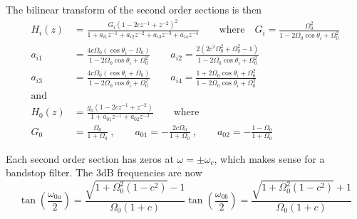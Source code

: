 The bilinear transform of the second order sections is then
\begin{align*}
	H_i(z) &= \frac{G_i(1-2cz^{-1}+z^{-2})^2}{1+a_{i1}z^{-1}+a_{i2}z^{-2}+a_{i3}z^{-3}+a_{i4}z^{-4}}
	\qquad \text{where} \quad
	G_i = \frac{\Omega_0^2}{1-2\Omega_0\cos\theta_i+\Omega_0^2} \\
	a_{i1} &= \frac{4c\Omega_0(\cos\theta_i-\Omega_0)}{1-2\Omega_0\cos\theta_i+\Omega_0^2} \qquad
	a_{i2} = \frac{2(2c^2\Omega_0^2+\Omega_0^2-1)}{1-2\Omega_0\cos\theta_i+\Omega_0^2} \\
	a_{i3} &= \frac{4c\Omega_0(\cos\theta_i+\Omega_0)}{1-2\Omega_0\cos\theta_i+\Omega_0^2} \qquad
	a_{i4} = \frac{1+2\Omega_0\cos\theta_i+\Omega_0^2}{1-2\Omega_0\cos\theta_i+\Omega_0^2} \\
	\text{and} \\
	H_0(z) &= \frac{g_0(1-2cz^{-1}+z^{-2})}{1+a_{01}z^{-1}+a_{02}z^{-2}} \qquad \text{where} \\
	G_0 &= \frac{\Omega_0}{1+\Omega_0}\:,\qquad
	a_{01} = -\frac{2c\Omega_0}{1+\Omega_0} \:,\qquad
	a_{02} = -\frac{1-\Omega_0}{1+\Omega_0}
\end{align*}

Each second order section has zeros at $\omega = \pm \omega_c$,  which makes
sense for a bandstop filter. The 3dB frequencies are now
\begin{equation*}
	\tan\left(\frac{\omega_{0a}}{2}\right) = \frac{\sqrt{1+\Omega_0^2(1-c^2)}-1}{\Omega_0(1+c)}
	\tan\left(\frac{\omega_{0b}}{2}\right) = \frac{\sqrt{1+\Omega_0^2(1-c^2)}+1}{\Omega_0(1+c)}
\end{equation*}
